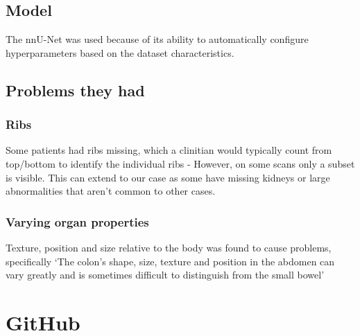 \documentclass[11pt]{article}
\begin{document}
\subsection{Model}

The nnU-Net was used because of its ability to automatically configure hyperparameters based on the dataset characteristics.

\subsection{Problems they had}

\subsubsection{Ribs}

Some patients had ribs missing, which a clinitian would typically count from top/bottom to identify the individual ribs - However, on some scans only a subset is visible. This can extend to our case as some have missing kidneys or large abnormalities that aren't common to other cases.

\subsubsection{Varying organ properties}

Texture, position and size relative to the body was found to cause problems, specifically `The colon's shape, size, texture and position in the abdomen can vary greatly and is sometimes difficult to distinguish from the small bowel'

\section{GitHub}

\printbibliography
\end{document}
